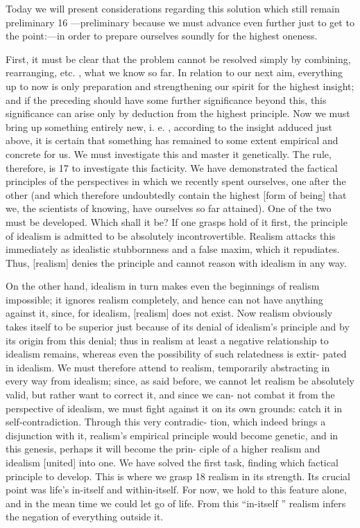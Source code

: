 Today we will present considerations regarding this solution which still
remain preliminary 16 —preliminary because we must advance even further just
to get to the point:—in order to prepare ourselves soundly for the highest
oneness.

First, it must be clear that the problem cannot be resolved simply by
combining, rearranging, etc.
, what we know so far.
In relation to our next aim,
everything up to now is only preparation and strengthening our spirit for the
highest insight; and if the preceding should have some further significance
beyond this, this significance can arise only by deduction from the highest
principle.
Now we must bring up something entirely new, i.
e.
, according to the
insight adduced just above, it is certain that something has remained to some
extent empirical and concrete for us.
We must investigate this and master it
genetically.
The rule, therefore, is 17 to investigate this facticity.
We have
demonstrated the factical principles of the perspectives in which we recently
spent ourselves, one after the other (and which therefore undoubtedly contain
the highest [form of being] that we, the scientists of knowing, have ourselves
so far attained).
One of the two must be developed.
Which shall it be?
If one grasps hold of it first, the principle of idealism is
admitted to be absolutely incontrovertible.
Realism attacks this immediately
as idealistic stubbornness and a false maxim, which it repudiates.
Thus,
[realism] denies the principle and cannot reason with idealism in any way.

On the other hand, idealism in turn makes even the beginnings of realism
impossible; it ignores realism completely, and hence can not have anything
against it, since, for idealism, [realism] does not exist.
Now realism obviously
takes itself to be superior just because of its denial of idealism’s principle and
by its origin from this denial; thus in realism at least a negative relationship
to idealism remains, whereas even the possibility of such relatedness is extir-
pated in idealism.
We must therefore attend to realism, temporarily
abstracting in every way from idealism; since, as said before, we cannot let
realism be absolutely valid, but rather want to correct it, and since we can-
not combat it from the perspective of idealism, we must fight against it on
its own grounds: catch it in self-contradiction.
Through this very contradic-
tion, which indeed brings a disjunction with it, realism’s empirical principle
would become genetic, and in this genesis, perhaps it will become the prin-
ciple of a higher realism and idealism [united] into one.
We have solved the
first task, finding which factical principle to develop.
This is where we
grasp 18 realism in its strength.
Its crucial point was life’s in-itself and
within-itself.
For now, we hold to this feature alone, and in the mean
time we could let go of life.
From this “in-itself ” realism infers the negation
of everything outside it.

